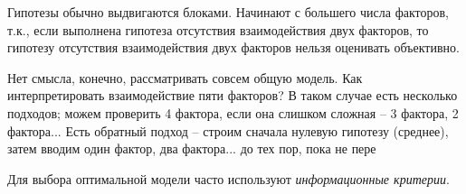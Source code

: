 \documentclass[main.tex]{subfiles}
\begin{document}
Гипотезы обычно выдвигаются блоками.
Начинают с большего числа факторов, т.к., если выполнена гипотеза отсутствия взаимодействия двух факторов, то гипотезу отсутствия взаимодействия двух факторов нельзя оценивать объективно.

Нет смысла, конечно, рассматривать совсем общую модель.
Как интерпретировать взаимодействие пяти факторов?
В таком случае есть несколько подходов; можем проверить 4 фактора, если она слишком сложная -- 3 фактора, 2 фактора... Есть обратный подход -- строим сначала нулевую гипотезу (среднее), затем вводим один фактор, два фактора... до тех пор, пока не пере

Для выбора оптимальной модели часто используют \emph{информационные критерии}.
\end{document}
